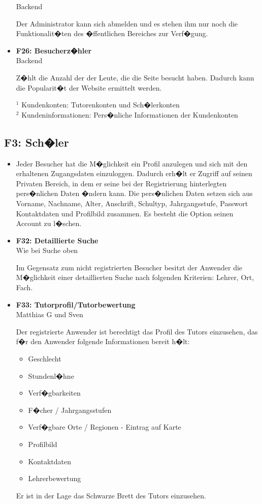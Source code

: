 \documentclass[10pt,a4paper]{scrartcl}
\begin{document}
\begin{itemize}
Backend

Der Administrator kann sich abmelden und es stehen ihm nur noch die Funktionalit�ten des �ffentlichen Bereiches zur Verf�gung.

\item[] \textbf{F26: Besucherz�hler}\\

Backend

Z�hlt die Anzahl der der Leute, die die Seite besucht haben. Dadurch kann die Popularit�t der Website ermittelt werden.
\bigskip

$^1$ Kundenkonten: Tutorenkonten und Sch�lerkonten\\
$^2$ Kundeninformationen: Pers�nliche Informationen der Kundenkonten
\end{itemize}




\subsection{F3: Sch�ler}
\begin{itemize}\item[]Jeder Besucher hat die M�glichkeit ein Profil anzulegen und sich mit den erhaltenen Zugangsdaten einzuloggen.
Dadurch erh�lt er Zugriff auf seinen Privaten Bereich, in dem er seine bei der Registrierung hinterlegten pers�nlichen Daten �ndern kann.
Die pers�nlichen Daten setzen sich aus Vorname, Nachname, Alter, Anschrift, Schultyp, Jahrgangsstufe, Passwort Kontaktdaten und Profilbild zusammen. 
Es besteht die Option seinen Account zu l�schen.

\item[] \textbf{F32: Detaillierte Suche}\\

Wie bei Suche oben

Im Gegensatz zum nicht registrierten Besucher besitzt der Anwender die M�glichkeit einer detaillierten Suche nach folgenden Kriterien: Lehrer, Ort, Fach.

\item[] \textbf{F33: Tutorprofil/Tutorbewertung}\\

Matthias G und Sven

Der registrierte Anwender ist berechtigt das Profil des Tutors einzusehen, das f�r den Anwender folgende Informationen bereit h�lt:

\begin{itemize}
	\item Geschlecht
	\item Stundenl�hne 
	\item Verf�gbarkeiten 
	\item F�cher / Jahrgangsstufen 
	\item Verf�gbare Orte / Regionen - Eintrag auf Karte
	\item Profilbild
	\item Kontaktdaten
	\item Lehrerbewertung
\end{itemize}
	
Er ist in der Lage das Schwarze Brett des Tutors einzusehen.
\end{itemize}
\end{document}
